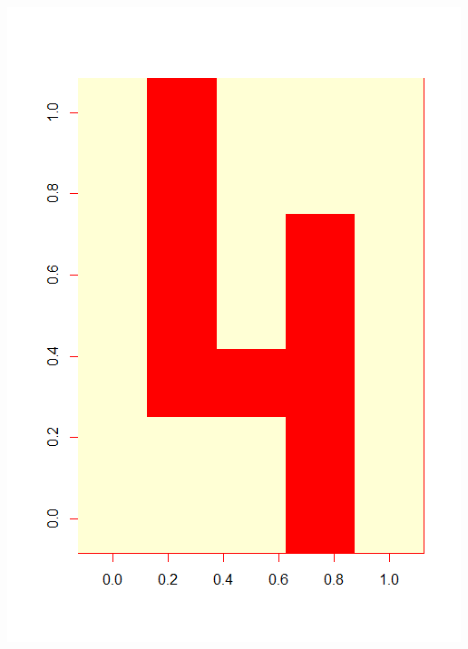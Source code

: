 \begin{minipage}{0.2\linewidth}
\includegraphics[width = \textwidth]{Figures/data4}

\end{minipage}
